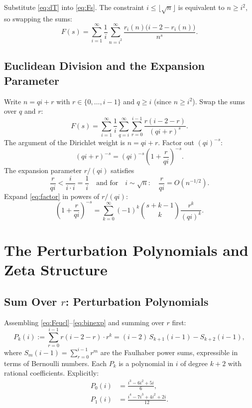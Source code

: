\documentclass[12pt]{article}
\theoremstyle{definition}
\begin{document}
Substitute \eqref{eq:dT} into \eqref{eq:Fs}.  The constraint
$i \le \lfloor\sqrt{n}\rfloor$ is equivalent to $n \ge i^2$, so swapping
the sums:
\begin{equation}
    F(s) = \sum_{i=1}^\infty \frac{1}{i}
        \sum_{n=i^2}^\infty \frac{r_i(n)\bigl(i-2-r_i(n)\bigr)}{n^s}.
    \label{eq:Fswap}
\end{equation}

\subsection{Euclidean Division and the Expansion Parameter}

Write $n = qi + r$ with $r \in \{0,\ldots,i-1\}$ and $q \ge i$ (since
$n \ge i^2$).  Swap the sums over $q$ and $r$:
\begin{equation}
    F(s) = \sum_{i=1}^\infty \frac{1}{i}
        \sum_{q=i}^\infty \sum_{r=0}^{i-1}
        \frac{r(i-2-r)}{(qi+r)^s}.
    \label{eq:Feucl}
\end{equation}
The argument of the Dirichlet weight is $n = qi + r$.  Factor out $(qi)^{-s}$:
\begin{equation}
    (qi+r)^{-s} = (qi)^{-s}\left(1+\frac{r}{qi}\right)^{-s}.
    \label{eq:factor}
\end{equation}
The expansion parameter $r/(qi)$ satisfies
\[
    \frac{r}{qi} < \frac{i}{i\cdot i} = \frac{1}{i}
    \quad\text{and for}\quad i \sim \sqrt{n}:\quad
    \frac{r}{qi} = O\!\left(n^{-1/2}\right).
\]
Expand \eqref{eq:factor} in powers of $r/(qi)$:
\begin{equation}
    \left(1+\frac{r}{qi}\right)^{-s}
    = \sum_{k=0}^\infty (-1)^k \binom{s+k-1}{k} \frac{r^k}{(qi)^k}.
    \label{eq:binexp}
\end{equation}

\section{The Perturbation Polynomials and Zeta Structure}

\subsection{Sum Over \texorpdfstring{$r$}{r}: Perturbation Polynomials}

Assembling \eqref{eq:Feucl}--\eqref{eq:binexp} and summing over $r$ first:
\begin{equation}
    P_k(i) := \sum_{r=0}^{i-1} r(i-2-r)\cdot r^k
    = (i-2)\,S_{k+1}(i-1) - S_{k+2}(i-1),
    \label{eq:Pk}
\end{equation}
where $S_m(i-1) = \sum_{r=0}^{i-1} r^m$ are the Faulhaber power sums,
expressible in terms of Bernoulli numbers.  Each $P_k$ is a polynomial in
$i$ of degree $k+2$ with rational coefficients.  Explicitly:
\begin{align}
    P_0(i) &= \frac{i^3 - 6i^2 + 5i}{6}, \label{eq:P0}\\
    P_1(i) &= \frac{i^4 - 7i^3 + 4i^2 + 2i}{12}. \label{eq:P1}
\end{align}
\end{document}
